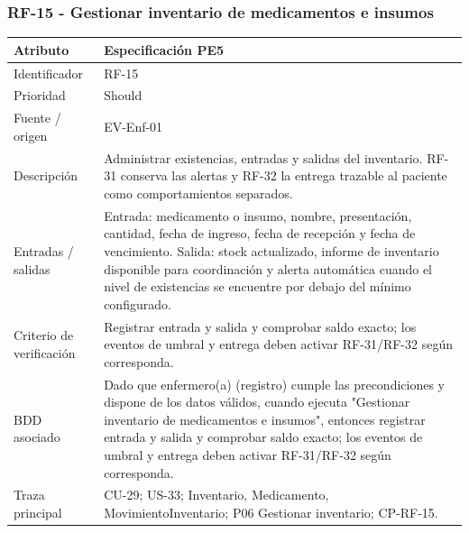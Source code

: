 \documentclass[11pt,a4paper]{article}
\begin{document}
	\subsubsection{RF-15 - Gestionar inventario de medicamentos e insumos}
	\begin{tabularx}{\textwidth}{p{3.2cm}Y}
		\toprule
		\textbf{Atributo} & \textbf{Especificación PE5}\\\midrule
		Identificador & RF-15\\
		Prioridad & Should\\
		Fuente / origen & EV-Enf-01\\
		Descripción & Administrar existencias, entradas y salidas del inventario. RF-31 conserva las alertas y RF-32 la entrega trazable al paciente como comportamientos separados.\\
		Entradas / salidas & Entrada: medicamento o insumo, nombre, presentación, cantidad, fecha de ingreso, fecha de recepción y fecha de vencimiento. Salida: stock actualizado, informe de inventario disponible para coordinación y alerta automática cuando el nivel de existencias se encuentre por debajo del mínimo configurado.\\
		Criterio de verificación & Registrar entrada y salida y comprobar saldo exacto; los eventos de umbral y entrega deben activar RF-31/RF-32 según corresponda.\\
		BDD asociado & Dado que enfermero(a) (registro) cumple las precondiciones y dispone de los datos válidos, cuando ejecuta "Gestionar inventario de medicamentos e insumos", entonces registrar entrada y salida y comprobar saldo exacto; los eventos de umbral y entrega deben activar RF-31/RF-32 según corresponda.\\
		Traza principal & CU-29; US-33; Inventario, Medicamento, MovimientoInventario; P06 Gestionar inventario; CP-RF-15.\\
		\bottomrule
	\end{tabularx}
\end{document}
